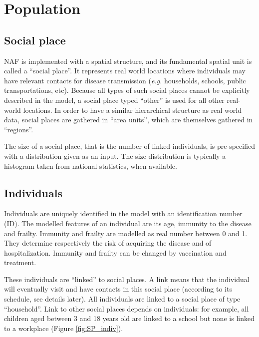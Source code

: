 \documentclass[11pt, onecolumn]{article}
\newcommand{\eg}{\textit{e.g.}\xspace}
\newcommand{\naf}{\textsf{NAF}\xspace}
\begin{document}
\section{Population}

\subsection{Social place}

\naf is implemented with a spatial structure, and its fundamental spatial unit is called a ``social place''. It represents real world locations where individuals may have relevant contacts for disease transmission (\eg households, schools, public transportations, etc). Because all types of such social places cannot be explicitly described in the model, a social place typed ``other'' is used for all other real-world locations.
In order to have a similar hierarchical structure as real world data, social places are gathered in ``area units'', which are themselves gathered in ``regions''.

The size of a social place, that is the number of linked individuals, is pre-specified with a distribution given as an input. The size distribution is typically a histogram taken from national statistics, when available. 




\subsection{Individuals}

Individuals are uniquely identified in the model with an identification number (ID). The modelled features of an individual are its age, immunity to the disease and frailty. Immunity and frailty are modelled as real number between 0 and 1. They determine respectively the risk of acquiring the disease and of hospitalization. Immunity and frailty can be changed by vaccination and  treatment.

These individuals are ``linked'' to social places. A link means that the individual will eventually visit and have contacts in this social place (according to its schedule, see details later).
All individuals are linked to a social place of type ``household''. Link to other social places depends on individuals: for example, all children aged between 3 and 18 years old are linked to a school but none is linked to a workplace (Figure \ref{fig:SP_indiv}). 
\end{document}
